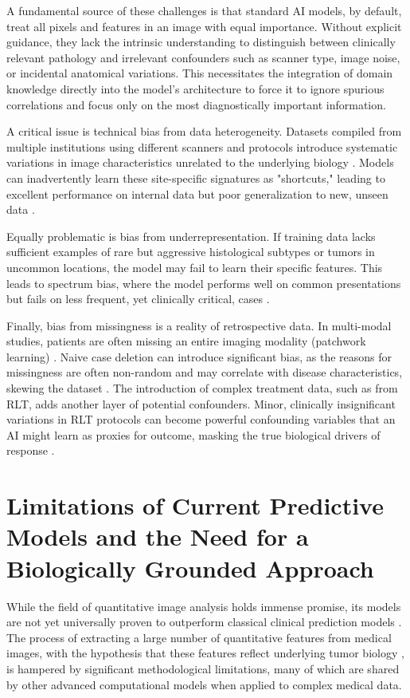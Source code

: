 \documentclass[11pt, a4paper]{article}
\begin{document}
A fundamental source of these challenges is that standard AI models, by default, treat all pixels and features in an image with equal importance. Without explicit guidance, they lack the intrinsic understanding to distinguish between clinically relevant pathology and irrelevant confounders such as scanner type, image noise, or incidental anatomical variations. This necessitates the integration of domain knowledge directly into the model's architecture to force it to ignore spurious correlations and focus only on the most diagnostically important information.

A critical issue is technical bias from data heterogeneity. Datasets compiled from multiple institutions using different scanners and protocols introduce systematic variations in image characteristics unrelated to the underlying biology \cite{SeoniShahini2024, HadjiiskiCha2023}. Models can inadvertently learn these site-specific signatures as "shortcuts," leading to excellent performance on internal data but poor generalization to new, unseen data \cite{LuoHuang2024, SouzaWinder2024}.

Equally problematic is bias from underrepresentation. If training data lacks sufficient examples of rare but aggressive histological subtypes or tumors in uncommon locations, the model may fail to learn their specific features. This leads to spectrum bias, where the model performs well on common presentations but fails on less frequent, yet clinically critical, cases \cite{Kocak2022, HattKrizsan2022}.

Finally, bias from missingness is a reality of retrospective data. In multi-modal studies, patients are often missing an entire imaging modality (patchwork learning) \cite{TerrailAyed2022}. Naive case deletion can introduce significant bias, as the reasons for missingness are often non-random and may correlate with disease characteristics, skewing the dataset \cite{Kocak2022, MartnezGarcaHernndezLemus2022}. The introduction of complex treatment data, such as from RLT, adds another layer of potential confounders. Minor, clinically insignificant variations in RLT protocols can become powerful confounding variables that an AI might learn as proxies for outcome, masking the true biological drivers of response \cite{PatellKurian2023, SadaghianiSheikhbahaei2022, GeorgeSamuel2023}.

\section{Limitations of Current Predictive Models and the Need for a Biologically Grounded Approach}
While the field of quantitative image analysis holds immense promise, its models are not yet universally proven to outperform classical clinical prediction models \cite{MolinBarry2024, FerroCobelli2022}. The process of extracting a large number of quantitative features from medical images, with the hypothesis that these features reflect underlying tumor biology \cite{MohseniniaZamaniSiahkali2024}, is hampered by significant methodological limitations, many of which are shared by other advanced computational models when applied to complex medical data.
\end{document}
